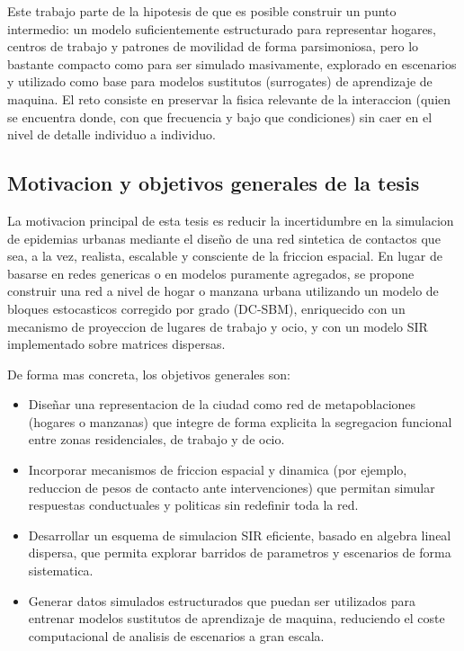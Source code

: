 Este trabajo parte de la hipotesis de que es posible construir un punto intermedio: un modelo suficientemente estructurado para representar hogares, centros de trabajo y patrones de movilidad de forma parsimoniosa, pero lo bastante compacto como para ser simulado masivamente, explorado en escenarios y utilizado como base para modelos sustitutos (surrogates) de aprendizaje de maquina. El reto consiste en preservar la fisica relevante de la interaccion (quien se encuentra donde, con que frecuencia y bajo que condiciones) sin caer en el nivel de detalle individuo a individuo.

\subsection{Motivacion y objetivos generales de la tesis}

La motivacion principal de esta tesis es reducir la incertidumbre en la simulacion de epidemias urbanas mediante el diseño de una red sintetica de contactos que sea, a la vez, realista, escalable y consciente de la friccion espacial. En lugar de basarse en redes genericas o en modelos puramente agregados, se propone construir una red a nivel de hogar o manzana urbana utilizando un modelo de bloques estocasticos corregido por grado (DC-SBM), enriquecido con un mecanismo de proyeccion de lugares de trabajo y ocio, y con un modelo SIR implementado sobre matrices dispersas.

De forma mas concreta, los objetivos generales son:

\begin{itemize}
    \item Diseñar una representacion de la ciudad como red de metapoblaciones (hogares o manzanas) que integre de forma explicita la segregacion funcional entre zonas residenciales, de trabajo y de ocio.
    \item Incorporar mecanismos de friccion espacial y dinamica (por ejemplo, reduccion de pesos de contacto ante intervenciones) que permitan simular respuestas conductuales y politicas sin redefinir toda la red.
    \item Desarrollar un esquema de simulacion SIR eficiente, basado en algebra lineal dispersa, que permita explorar barridos de parametros y escenarios de forma sistematica.
    \item Generar datos simulados estructurados que puedan ser utilizados para entrenar modelos sustitutos de aprendizaje de maquina, reduciendo el coste computacional de analisis de escenarios a gran escala.
\end{itemize}

